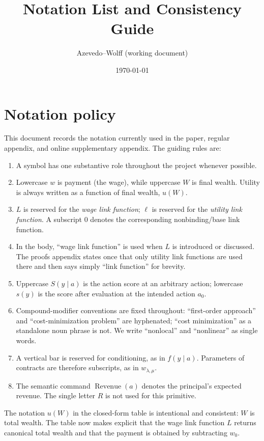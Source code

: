 \documentclass[11pt]{article}
\title{Notation List and Consistency Guide}
\author{Azevedo--Wolff (working document)}
\date{\today}
\newcommand{\Revenue}{\operatorname{Revenue}}
\begin{document}
\maketitle

\section{Notation policy}

This document records the notation currently used in the paper, regular
appendix, and online supplementary appendix.  The guiding rules are:
\begin{enumerate}
    \item A symbol has one substantive role throughout the project whenever
    possible.
    \item Lowercase $w$ is payment (the wage), while uppercase $W$ is final
    wealth.  Utility is always written as a function of final wealth, $u(W)$.
    \item $L$ is reserved for the \emph{wage link function}; $\ell$ is
    reserved for the \emph{utility link function}.  A subscript $0$ denotes
    the corresponding nonbinding/base link function.
    \item In the body, ``wage link function'' is used when $L$ is introduced
    or discussed.  The proofs appendix states once that only utility link
    functions are used there and then says simply ``link function'' for
    brevity.
    \item Uppercase $S(y\mid a)$ is the action score at an arbitrary action;
    lowercase $s(y)$ is the score after evaluation at the intended action
    $a_0$.
    \item Compound-modifier conventions are fixed throughout: ``first-order
    approach'' and ``cost-minimization problem'' are hyphenated;
    ``cost minimization'' as a standalone noun phrase is not.  We write
    ``nonlocal'' and ``nonlinear'' as single words.
    \item A vertical bar is reserved for conditioning, as in $f(y\mid a)$.
    Parameters of contracts are therefore subscripts, as in
    $w_{\lambda,\mu}$.
    \item The semantic command $\Revenue(a)$ denotes the principal's expected
    revenue.  The single letter $R$ is not used for this primitive.
\end{enumerate}

The notation $u(W)$ in the closed-form table is intentional and consistent:
$W$ is total wealth.  The table now makes explicit that the wage link function $L$
returns canonical total wealth and that the payment is obtained by subtracting
$w_0$.
\end{document}
